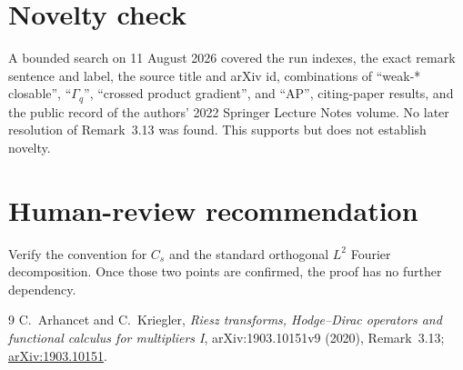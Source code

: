\documentclass[11pt]{article}
\begin{document}
\section*{Novelty check}
A bounded search on 11 August 2026 covered the run indexes, the exact remark
sentence and label, the source title and arXiv id, combinations of
``weak-* closable'', ``$\Gamma_q$'', ``crossed product gradient'', and ``AP'',
citing-paper results, and the public record of the authors' 2022 Springer
Lecture Notes volume.  No later resolution of Remark~3.13 was found.  This
supports but does not establish novelty.

\section*{Human-review recommendation}
Verify the convention for $C_s$ and the standard orthogonal $L^2$ Fourier
decomposition.  Once those two points are confirmed, the proof has no further
dependency.

\begin{thebibliography}{9}
C.~Arhancet and C.~Kriegler,
\emph{Riesz transforms, Hodge--Dirac operators and functional calculus for
multipliers I}, arXiv:1903.10151v9 (2020), Remark~3.13;
\href{https://arxiv.org/abs/1903.10151}{arXiv:1903.10151}.
\end{thebibliography}
\end{document}
